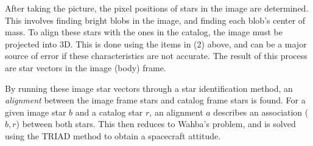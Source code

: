 After taking the picture, the pixel positions of stars in the image are determined. This involves finding bright blobs
in the image, and finding each blob's center of mass. To align these stars with the ones in the catalog, the image must
be projected into 3D. This is done using the items in (2) above, and can be a major source of error if these
characteristics are not accurate. The result of this process are star vectors in the image (body) frame.

By running these image star vectors through a star identification method, an \textit{alignment} between the image frame
stars and catalog frame stars is found. For a given image star $b$ and a catalog star $r$, an alignment $a$ describes
an association ($b, r$) between both stars. This then reduces to Wahba's problem, and is solved using the TRIAD method
to obtain a spacecraft attitude.